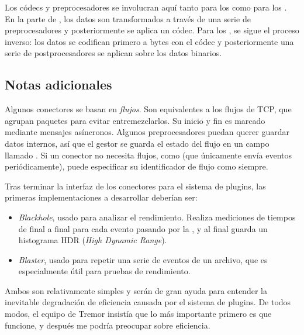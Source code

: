 Los códecs y preprocesadores se involucran aquí tanto para los \sources como
para los \sinks. En la parte de \source, los datos son transformados a través de
una serie de preprocesadores y posteriormente se aplica un códec. Para los
\sinks, se sigue el proceso inverso: los datos se codifican primero a bytes con
el códec y posteriormente una serie de postprocesadores se aplican sobre los
datos binarios.

\subsection{Notas adicionales}

Algunos conectores se basan en \emph{flujos}. Son equivalentes a los flujos de
TCP, que agrupan paquetes para evitar entremezclarlos. Su inicio y fin es
marcado mediante mensajes asíncronos. Algunos preprocesadores puedan querer
guardar datos internos, así que el gestor se guarda el estado del flujo en un
campo llamado . Si un conector no necesita flujos, como
 (que únicamente envía eventos periódicamente), puede
especificar su identificador de flujo como  siempre.

Tras terminar la interfaz de los conectores para el sistema de plugins, las
primeras implementaciones a desarrollar deberían ser:

\begin{itemize}
    \item \emph{Blackhole}, usado para analizar el rendimiento. Realiza
        mediciones de tiempos de final a final para cada evento pasando por la
        \pipeline, y al final guarda un histograma HDR (\emph{High Dynamic
        Range}).

    \item \emph{Blaster}, usado para repetir una serie de eventos de un archivo,
        que es especialmente útil para pruebas de rendimiento.

\end{itemize}

Ambos son relativamente simples y serán de gran ayuda para entender la
inevitable degradación de eficiencia causada por el sistema de plugins. De todos
modos, el equipo de Tremor insistía que lo más importante primero es que
funcione, y después me podría preocupar sobre eficiencia.
